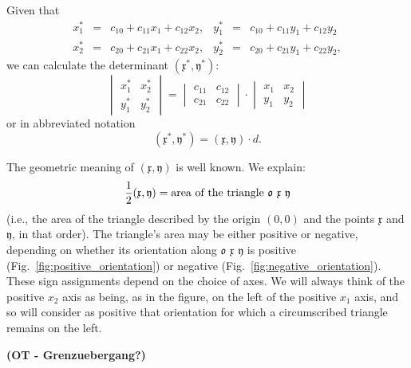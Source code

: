 \documentclass[11pt]{book} \usepackage{amssymb}
\newcommand{\myvec}[1]{\mathfrak{#1}}
\begin{document}
Given that
\begin{equation}
  \label{eq:xy_affinity}
  \begin{array}{rclrcl}
    x_1^* &=& c_{10}+c_{11}x_1+c_{12}x_2, &y_1^* &=& c_{10}+c_{11}y_1+c_{12}y_2\\
    x_2^* &=& c_{20}+c_{21}x_1+c_{22}x_2, &y_2^* &=& c_{20}+c_{21}y_1+c_{22}y_2,
  \end{array}  
\end{equation}
we can calculate the determinant $(\myvec{x}^*,\myvec{y}^*)$:
\begin{equation}
  \label{eq:xy_det_transformed}
  \begin{vmatrix}x_1^*&x_2^*\\y_1^*&y_2^*\end{vmatrix}=\begin{vmatrix}c_{11}&c_{12}\\c_{21}&c_{22}\end{vmatrix}\cdot\begin{vmatrix}x_1&x_2\\y_1&y_2\end{vmatrix}
\end{equation}
or in abbreviated notation
\begin{equation}
  \label{eq:xy_det_transformed_short}
  (\myvec{x}^*,\myvec{y}^*)=(\myvec{x},\myvec{y})\cdot d.
\end{equation}

The geometric meaning of $(\myvec{x},\myvec{y})$ is well known. We explain:
\begin{equation}
  \label{eq:triangle_area}
  {1\over 2}(\myvec{x},\myvec{y})=\mbox{area of the triangle $\myvec{o}$ $\myvec{x}$ $\myvec{y}$}
\end{equation}
(i.e., the area of the triangle described by the origin $(0,0)$ and the 
points $\myvec{x}$ and $\myvec{y}$, in that order). The triangle's area may
be either positive or negative, depending on whether its orientation 
along $\myvec{o}$ $\myvec{x}$ $\myvec{y}$ is
positive (Fig.~\ref{fig:positive_orientation}) or negative 
(Fig.~\ref{fig:negative_orientation}). These sign assignments depend on the
choice of axes. We will always think of the positive $x_2$ axis as being,
as in the figure, on the left of the positive $x_1$ axis, and so will consider 
as positive that orientation for which a circumscribed triangle remains on 
the left.

{\bf (OT - Grenzuebergang?)}
\end{document}
